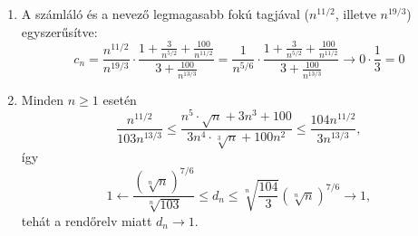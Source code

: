 \documentclass[11pt]{scrartcl}
\begin{document}
\begin{enumerate}
	\item A számláló és a nevező legmagasabb fokú tagjával
	      ($n^{11/2}$, illetve $n^{19/3}$) egyszerűsítve:
	      \[
		      c_n
		      = \frac{n^{11/2}}{n^{19/3}} \cdot
		      \frac{1 + \frac{3}{n^{5/2}} + \frac{100}{n^{11/2}}}{3 + \frac{100}{n^{13/3}}}
		      = \frac{1}{n^{5/6}} \cdot
		      \frac{1 + \frac{3}{n^{5/2}} + \frac{100}{n^{11/2}}}{3 + \frac{100}{n^{13/3}}}
		      \to 0 \cdot \frac{1}{3} = 0
	      \]

	\item Minden $n \ge 1$ esetén
	      \[
		      \frac{n^{11/2}}{103 n^{13/3}}
		      \le \frac{n^5 \cdot \sqrt{n} + 3n^3 + 100}{3n^4 \cdot \sqrt[3]{n} + 100n^2}
		      \le \frac{104 n^{11/2}}{3 n^{13/3}},
	      \]
	      így
	      \[
		      1
		      \leftarrow \frac{\left(\sqrt[n]{n}\right)^{7/6}}{\sqrt[n]{103}}
		      \le d_n
		      \le \sqrt[n]{\frac{104}{3}} \left(\sqrt[n]{n}\right)^{7/6}
		      \to 1,
	      \]
	      tehát a rendőrelv miatt $d_n \to 1$.
\end{enumerate}
\end{document}
